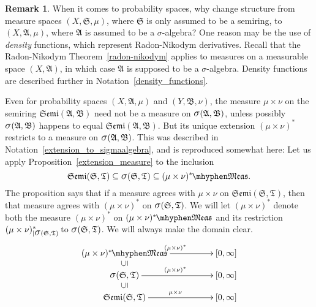 \documentclass[
twoside=true,
paper=letter,
fontsize=9pt,
pagesize=auto,
leqno,
openany,
headsepline,
overfullrule,
]{scrbook}
\theoremstyle{plain}
\theoremstyle{plain}
\theoremstyle{definition}
\newtheorem{rmk}[thm]{Remark}
\theoremstyle{bfnoteitalic}
\theoremstyle{bfnoteroman}
\newcommand{\sigalg}[1]{\mathfrak{#1}}
\newcommand{\subsetequp}{\rotatebox{90}{$\subseteq$}}
\newcommand{\sagb}{\mathop{\hbox{\large{$\sigma$}}}\nolimits}
\newcommand{\textsigma}{\hbox{\large{$\sigma$}}\kern-1pt}
\newcommand{\restrictedto}[1]{_{\lvert#1}\kern-1.5pt}
\newcommand{\semiring}{\sigalg{S}}
\newcommand{\semiringii}{\sigalg{T}}
\newcommand{\sigmaalgebra}{\sigalg{A}}
\newcommand{\sigmaalgebraii}{\sigalg{B}}
\newcommand{\productsemiring}[2]{\mathfrak{Semi}(#1,#2)}
\newcommand{\productsig}[2]{\sagb(#1,#2)}
\newcommand{\measurable}[1]{{#1}\mhyphen\mathfrak{Meas}}
\newcommand{\kernast}{\ast\kern-1pt}
\newcommand{\measurespace}{X}
\newcommand{\measurespaceii}{Y}
\newcommand{\measure}{\mu}
\newcommand{\measmu}{\mu}
\newcommand{\measureii}{\nu}
\newcommand{\measnu}{\nu}
\begin{document}
\begin{rmk}\label{semiring_to_sigmaalgebra}
When it comes to probability spaces, why change structure from measure spaces
$(\measurespace,\semiring,\measure)$, where $\semiring$ is only assumed to be a semiring,
to
$(\measurespace,\sigmaalgebra,\measure)$, where $\sigmaalgebra$ is assumed to be a
\textsigma\hyp{}algebra?
One reason may be the use of \emph{density} functions, which represent Radon-Nikodym derivatives.
Recall that the Radon-Nikodym Theorem~\ref{radon-nikodym} applies to measures on a measurable space
$(\measurespace, \sigmaalgebra)$, in which case $\sigmaalgebra$ is supposed to be a \textsigma\hyp{}algebra.  Density functions are described further in Notation~\ref{density_functions}.

Even for probability spaces
$(\measurespace,\sigmaalgebra,\measmu)$
and
$(\measurespaceii,\sigmaalgebraii,\measnu)$,
the measure $\measmu\times\measnu$ on the semiring
$\productsemiring{\sigmaalgebra}{\sigmaalgebraii}$ need not be a measure on
$\productsig{\sigmaalgebra}{\sigmaalgebraii}$, unless possibly
$\productsig{\sigmaalgebra}{\sigmaalgebraii}$
happens to equal
$\productsemiring{\sigmaalgebra}{\sigmaalgebraii}$.
But its unique extension
$(\measmu\times\measnu)^*$ restricts to a measure on
$\productsig{\sigmaalgebra}{\sigmaalgebraii}$.
This was described in Notation~\ref{extension_to_sigmaalgebra}, and is reproduced somewhat here:
Let us apply Proposition~\ref{extension_measure} to the inclusion
\[
\productsemiring{\semiring}{\semiringii}
\subseteq
\productsig{\semiring}{\semiringii}
\subseteq
\measurable{(\measure\times\measureii)^\kernast}.
\]
The proposition says that if a measure agrees with $\measmu\times\measnu$ on
$\productsemiring{\semiring}{\semiringii}$, then that measure agrees with
$(\measmu\times\measnu)^*$ on
$\productsig{\semiring}{\semiringii}$.
We will let $(\measmu\times\measnu)^*$ denote both the measure
$(\measmu\times\measnu)^*$ on $\measurable{(\measure\times\measureii)^\kernast}$
and its restriction
$(\measmu\times\measnu)^*\restrictedto{\productsig{\semiring}{\semiringii}}$
to $\productsig{\semiring}{\semiringii}$.
We will always make the domain clear.
\[
\xymatrix@R=-2pt@C=50pt{
\measurable{(\measmu\times\measnu)^\kernast}
\ar[r]^{(\measmu\times\measnu)^*} & [0, \infty] \\
\subsetequp & \\
\productsig{\semiring}{\semiringii}
\ar[r]^{(\measmu\times\measnu)^*} & [0, \infty] \\
\subsetequp & \\
\productsemiring{\semiring}{\semiringii}
\ar[r]^{\measmu\times\measnu} & [0, \infty] \\
}
\]
\end{rmk}
\end{document}
